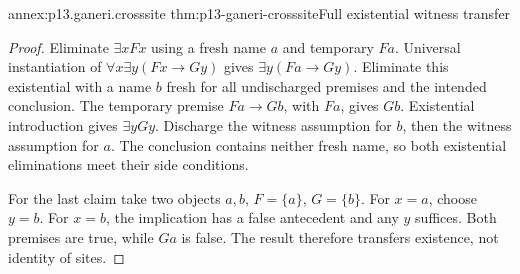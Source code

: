 \begin{annexitem}{annex:p13.ganeri.crosssite}
 {thm:p13-ganeri-crosssite}{Full existential witness transfer}
\begin{proof}
Eliminate \(\exists xFx\) using a fresh name \(a\) and temporary \(Fa\).
Universal instantiation of \(\forall x\exists y(Fx\to Gy)\) gives
\(\exists y(Fa\to Gy)\). Eliminate this existential with a name \(b\)
fresh for all undischarged premises and the intended conclusion.
The temporary premise \(Fa\to Gb\), with \(Fa\), gives \(Gb\).
Existential introduction gives \(\exists yGy\).
Discharge the witness assumption for \(b\), then the witness assumption
for \(a\). The conclusion contains neither fresh name, so both
existential eliminations meet their side conditions.

For the last claim take two objects \(a,b\), \(F=\{a\}\), \(G=\{b\}\).
For \(x=a\), choose \(y=b\). For \(x=b\), the implication has a false
antecedent and any \(y\) suffices. Both premises are true, while \(Ga\)
is false. The result therefore transfers existence, not identity of sites.
\end{proof}
\end{annexitem}

